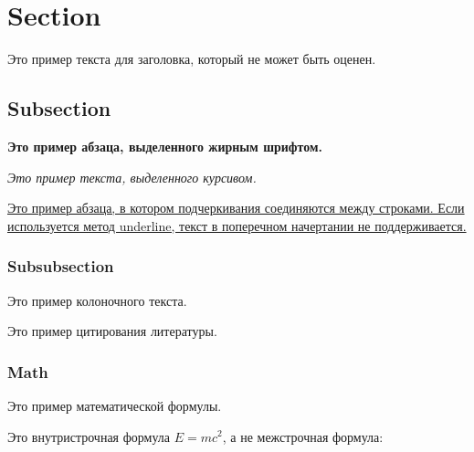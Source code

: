 \section{Section}

Это пример текста для заголовка, который не может быть оценен.

\subsection{Subsection}

\textbf{Это пример абзаца, выделенного жирным шрифтом.}

\textit{Это пример текста, выделенного курсивом.}

\uline{Это пример абзаца, в котором подчеркивания соединяются между строками. Если используется метод underline, текст в поперечном начертании не поддерживается.}

\subsubsection{Subsubsection}

Это пример колоночного текста.

\begin{Parallel}{0.55\textwidth}{0.4\textwidth}



\ParallelPar

\end{Parallel}

Это пример цитирования литературы\cite{knuth1984texbook}.

\subsubsection{Math}

Это пример математической формулы.

Это внутристрочная формула $E=mc^2$, а не межстрочная формула:


